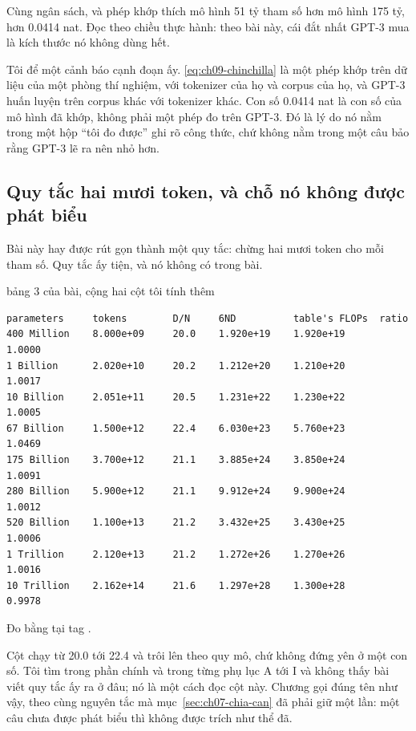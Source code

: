 Cùng ngân sách, và phép khớp thích mô hình 51 tỷ tham số hơn mô hình 175 tỷ,
hơn 0.0414 nat. Đọc theo chiều thực hành: theo bài này, cái đắt nhất GPT-3 mua
là kích thước nó không dùng hết.

Tôi để một cảnh báo cạnh đoạn ấy. \eqref{eq:ch09-chinchilla} là một phép khớp
trên dữ liệu của một phòng thí nghiệm, với tokenizer của họ và corpus của họ, và
GPT-3 huấn luyện trên corpus khác với tokenizer khác. Con số 0.0414 nat là con
số của mô hình đã khớp, không phải một phép đo trên GPT-3. Đó là lý do nó nằm
trong một hộp \enquote{tôi đo được} ghi rõ công thức, chứ không nằm trong một
câu bảo rằng GPT-3 lẽ ra nên nhỏ hơn.

\subsection*{Quy tắc hai mươi token, và chỗ nó không được phát biểu}

%
Bài này hay được rút gọn thành một quy tắc: chừng hai mươi token cho mỗi tham
số. Quy tắc ấy tiện, và nó không có trong bài.

\begin{measured}{bảng 3 của bài, cộng hai cột tôi tính thêm}
\begin{verbatim}
parameters     tokens        D/N     6ND          table's FLOPs  ratio
400 Million    8.000e+09     20.0    1.920e+19    1.920e+19      1.0000
1 Billion      2.020e+10     20.2    1.212e+20    1.210e+20      1.0017
10 Billion     2.051e+11     20.5    1.231e+22    1.230e+22      1.0005
67 Billion     1.500e+12     22.4    6.030e+23    5.760e+23      1.0469
175 Billion    3.700e+12     21.1    3.885e+24    3.850e+24      1.0091
280 Billion    5.900e+12     21.1    9.912e+24    9.900e+24      1.0012
520 Billion    1.100e+13     21.2    3.432e+25    3.430e+25      1.0006
1 Trillion     2.120e+13     21.2    1.272e+26    1.270e+26      1.0016
10 Trillion    2.162e+14     21.6    1.297e+28    1.300e+28      0.9978
\end{verbatim}

Đo bằng  tại tag .
\end{measured}

Cột  chạy từ 20.0 tới 22.4 và trôi lên theo quy mô, chứ không đứng
yên ở một con số. Tôi tìm trong phần chính và trong từng phụ lục A tới I và
không thấy bài
viết quy tắc ấy ra ở đâu; nó là một cách đọc cột này. Chương gọi đúng tên như
vậy, theo cùng nguyên tắc mà mục~\ref{sec:ch07-chia-can} đã phải giữ một lần:
một câu chưa được phát biểu thì không được trích như thể đã.

